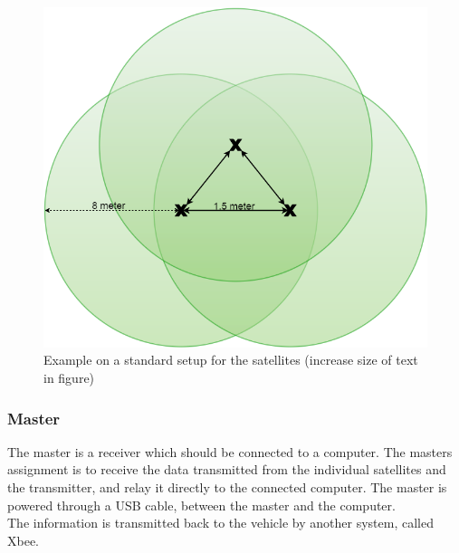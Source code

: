 \begin{figure}[H]
	\centering
	\includegraphics[scale=0.5]{figures/ReceiverSetup.png}
	\caption{Example on a standard setup for the satellites (increase size of text in figure)}
	\label{receiverSetup}
\end{figure}

\subsubsection{Master}
The master is a receiver which should be connected to a computer. The masters assignment is to receive the data transmitted from the individual satellites and the transmitter, and relay it directly to the connected computer. The master is powered through a USB cable, between the master and the computer.\\
The information is transmitted back to the vehicle by another system, called Xbee.

